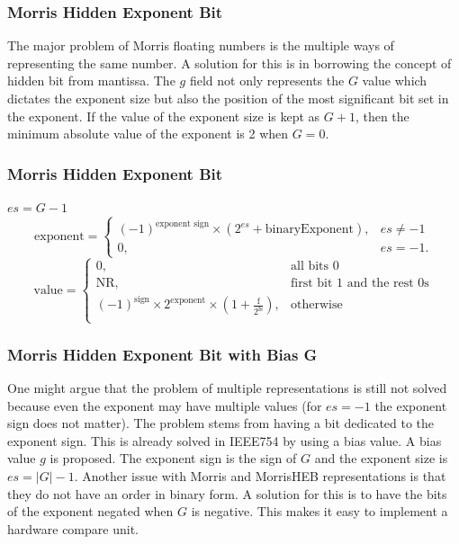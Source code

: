 \begin{frame}
    \frametitle{Morris Hidden Exponent Bit}
The major problem of Morris floating numbers is the multiple ways of representing the same number.
A solution for this is in borrowing the concept of hidden bit from mantissa.
The $g$ field not only represents the $G$ value which dictates the exponent size but also the position of the most significant bit set in the exponent.
If the value of the exponent size is kept as $G+1$, then the minimum absolute value of the exponent is 2 when $G=0$.
\end{frame}
\begin{frame}
    \frametitle{Morris Hidden Exponent Bit}

    $es=G-1$\\
\begin{equation}
    \text{exponent} = \begin{cases}
    (-1)^{\text{exponent sign}} \times ( 2^{es} + \text{binaryExponent} ), & es \neq -1\\
    0, & es=-1.
\end{cases}
\end{equation}
\begin{equation}
    \text{value} = \begin{cases}
    0, & \text{all bits 0}\\
    \text{NR}, & \text{first bit 1 and the rest 0s} \\
    (-1)^{\text{sign}} \times 2^{\text{exponent}} \times (1 + \frac{\text{f}}{2^{\text{fs}}}), & \text{otherwise} \\
  \end{cases}
\end{equation}
\end{frame}

\begin{frame}
    \frametitle{Morris Hidden Exponent Bit with Bias G}
One might argue that the problem of multiple representations is still not solved because even the
exponent may have multiple values (for $es=-1$ the exponent sign does not matter).
The problem stems from having a bit dedicated to the exponent sign.
This is already solved in IEEE754 by using a bias value. A bias value $g$ is proposed.
The exponent sign is the sign of $G$ and the exponent size is $es=|G|-1$.
Another issue with Morris and MorrisHEB representations is that they do not have an order in binary form.
A solution for this is to have the bits of the exponent negated when $G$ is negative.
This makes it easy to implement a hardware compare unit.

\end{frame}


